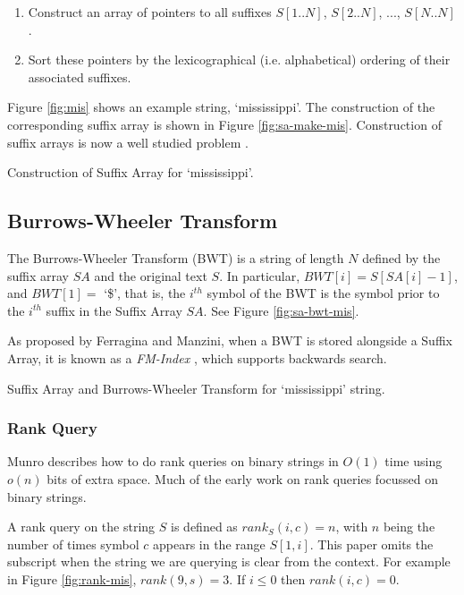 \begin{enumerate}
	\item
		Construct an array of pointers to all suffixes $S[1..N]$, 
		$S[2..N]$, ..., $S[N..N]$.
	\item
		Sort these pointers by the lexicographical (i.e. alphabetical) ordering 
		of their associated suffixes.
\end{enumerate}

Figure \ref{fig:mis} shows an example string, `mississippi'. The construction of 
the corresponding suffix array is shown in Figure \ref{fig:sa-make-mis}.
Construction of suffix arrays is now a well studied problem \cite{puglisi2007}.

			{Construction of Suffix Array for `mississippi'.}



\subsection{Burrows-Wheeler Transform}
The Burrows-Wheeler Transform (BWT) is a string of length $N$ defined by the suffix array $SA$ and the original text $S$. In particular, $BWT[i] = S[SA[i]-1]$, and $BWT[1] = $ `\$', that is, the $i^{th}$ symbol of the BWT is the symbol prior to the $i^{th}$ suffix in the Suffix Array $SA$. See Figure \ref{fig:sa-bwt-mis}.

As proposed by Ferragina and Manzini, when a BWT is stored alongside a Suffix Array, it is known as a \emph{FM-Index} \cite{ferragina2000}, which supports backwards search.

			{Suffix Array and Burrows-Wheeler Transform for
			`mississippi' string.}

\subsubsection{Rank Query}
Munro \cite{munro1996} describes how to do rank queries on binary strings in $O(1)$ time using $o(n)$ bits of extra space. Much of the early work on rank
queries focussed on binary strings.

A rank query on the string $S$ is 
defined as $rank_S(i, c) = n $, with $n$ being the number of times symbol $c$ 
appears in the range $S[1, i]$. This paper omits 
the subscript when the string we are querying is clear from the context. For 
example in Figure \ref{fig:rank-mis}, $rank(9, s) = 3$. If $i \le 0$ then 
$rank(i, c) = 0$.

